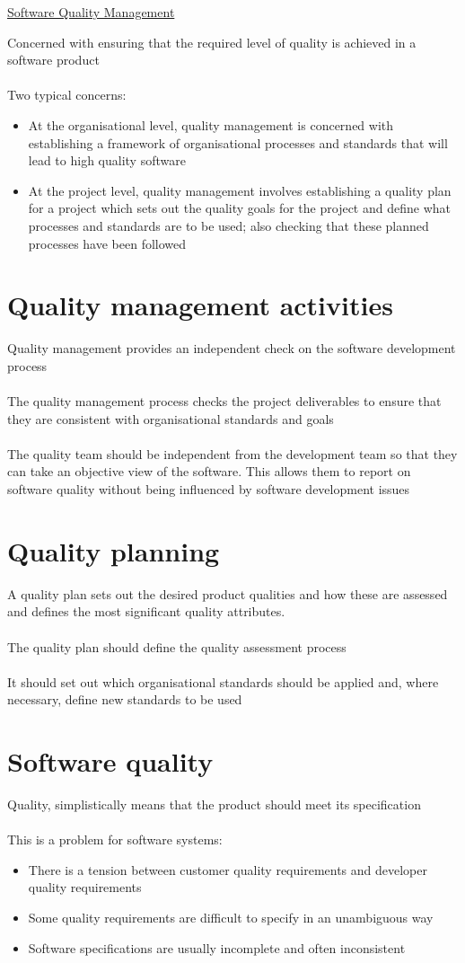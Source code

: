 \documentclass{article}[18pt]
\begin{document}
\begin{center}
\underline{\huge Software Quality Management}
\end{center}
Concerned with ensuring that the required level of quality is achieved in a software product\\
\\
Two typical concerns:
\begin{itemize}
	\item At the organisational level, quality management is concerned with establishing a framework of organisational processes and standards that will lead to high quality software
	\item At the project level, quality management involves establishing a quality plan for a project which sets out the quality goals for the project and define what processes and standards are to be used; also checking that these planned processes have been followed
\end{itemize}
\section{Quality management activities}
Quality management provides an independent check on the software development process\\
\\
The quality management process checks the project deliverables to ensure that they are consistent with organisational standards and goals\\
\\
The quality team should be independent from the development team so that they can take an objective view of the software. This allows them to report on software quality without being influenced by software development issues
\section{Quality planning}
A quality plan sets out the desired product qualities and how these are assessed and defines the most significant quality attributes.\\
\\
The quality plan should define the quality assessment process\\
\\
It should set out which organisational standards should be applied and, where necessary, define new standards to be used
\section{Software quality}
Quality, simplistically means that the product should meet its specification\\
\\
This is a problem for software systems:
\begin{itemize}
	\item There is a tension between customer quality requirements and developer quality requirements
	\item Some quality requirements are difficult to specify in an unambiguous way
	\item Software specifications are usually incomplete and often inconsistent
\end{itemize} 
\end{document}
